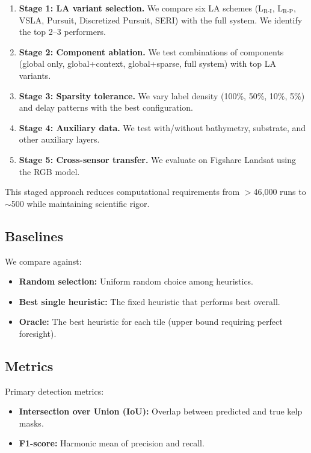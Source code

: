 \documentclass[11pt,a4paper]{article}
\begin{document}
\begin{enumerate}
    \item \textbf{Stage 1: LA variant selection.} We compare six LA schemes (L$_{\text{R-I}}$, L$_{\text{R-P}}$, VSLA, Pursuit, Discretized Pursuit, SERI) with the full system. We identify the top 2--3 performers.

    \item \textbf{Stage 2: Component ablation.} We test combinations of components (global only, global+context, global+sparse, full system) with top LA variants.

    \item \textbf{Stage 3: Sparsity tolerance.} We vary label density (100\%, 50\%, 10\%, 5\%) and delay patterns with the best configuration.

    \item \textbf{Stage 4: Auxiliary data.} We test with/without bathymetry, substrate, and other auxiliary layers.

    \item \textbf{Stage 5: Cross-sensor transfer.} We evaluate on Figshare Landsat using the RGB model.
\end{enumerate}

This staged approach reduces computational requirements from $>$46,000 runs to $\sim$500 while maintaining scientific rigor.

\subsection{Baselines}

We compare against:
\begin{itemize}[noitemsep]
    \item \textbf{Random selection:} Uniform random choice among heuristics.
    \item \textbf{Best single heuristic:} The fixed heuristic that performs best overall.
    \item \textbf{Oracle:} The best heuristic for each tile (upper bound requiring perfect foresight).
\end{itemize}

\subsection{Metrics}

Primary detection metrics:
\begin{itemize}[noitemsep]
    \item \textbf{Intersection over Union (IoU):} Overlap between predicted and true kelp masks.
    \item \textbf{F1-score:} Harmonic mean of precision and recall.
\end{itemize}
\end{document}

